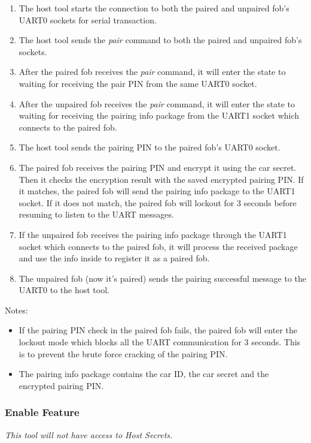 \documentclass[11pt,oneside,onecolumn,letterpaper]{article}
\begin{document}
\begin{enumerate}
	\item The host tool starts the connection to both the paired and unpaired fob's UART0 sockets for serial transaction.
	\item The host tool sends the \textit{pair} command to both the paired and unpaired fob's sockets.
	\item After the paired fob receives the \textit{pair} command, it will enter the state to waiting for receiving the pair PIN from the same UART0 socket.
	\item After the unpaired fob receives the \textit{pair} command, it will enter the state to waiting for receiving the pairing info package from the UART1 socket which connects to the paired fob.
	\item The host tool sends the pairing PIN to the paired fob's UART0 socket.
	\item The paired fob receives the pairing PIN and encrypt it using the car secret. Then it checks the encryption result with the saved encrypted pairing PIN. If it matches, the paired fob will send the pairing info package to the UART1 socket. If it does not match, the paired fob will lockout for 3 seconds before resuming to listen to the UART messages.
	\item If the unpaired fob receives the pairing info package through the UART1 socket which connects to the paired fob, it will process the received package and use the info inside to register it as a paired fob.
	\item The unpaired fob (now it's paired) sends the pairing successful message to the UART0 to the host tool.
\end{enumerate}

Notes:
\begin{itemize}
	\item If the pairing PIN check in the paired fob fails, the paired fob will enter the lockout mode which blocks all the UART communication for 3 seconds. This is to prevent the brute force cracking of the pairing PIN.
	\item The pairing info package contains the car ID, the car secret and the encrypted pairing PIN.
\end{itemize}

\subsubsection{Enable Feature}

\textit{This tool will not have access to Host Secrets.}
\end{document}
